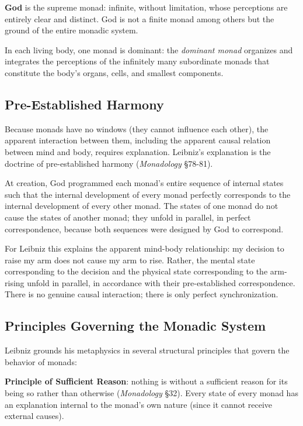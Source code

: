\documentclass[12pt]{article}
\begin{document}
\textbf{God} is the supreme monad: infinite, without limitation, whose
perceptions are entirely clear and distinct. God is not a finite monad
among others but the ground of the entire monadic system.

In each living body, one monad is dominant: the \emph{dominant monad}
organizes and integrates the perceptions of the infinitely many
subordinate monads that constitute the body's organs, cells, and
smallest components.

\subsection{Pre-Established Harmony}\label{pre-established-harmony}

Because monads have no windows (they cannot influence each other), the
apparent interaction between them, including the apparent causal
relation between mind and body, requires explanation. Leibniz's
explanation is the doctrine of pre-established harmony
(\emph{Monadology} §78-81).

At creation, God programmed each monad's entire sequence of internal
states such that the internal development of every monad perfectly
corresponds to the internal development of every other monad. The states
of one monad do not cause the states of another monad; they unfold in
parallel, in perfect correspondence, because both sequences were
designed by God to correspond.

For Leibniz this explains the apparent mind-body relationship: my
decision to raise my arm does not cause my arm to rise. Rather, the
mental state corresponding to the decision and the physical state
corresponding to the arm-rising unfold in parallel, in accordance with
their pre-established correspondence. There is no genuine causal
interaction; there is only perfect synchronization.

\subsection{Principles Governing the Monadic System}\label{principles-governing-the-monadic-system}

Leibniz grounds his metaphysics in several structural principles that
govern the behavior of monads:

\textbf{Principle of Sufficient Reason}: nothing is without a sufficient
reason for its being so rather than otherwise (\emph{Monadology} §32).
Every state of every monad has an explanation internal to the monad's
own nature (since it cannot receive external causes).
\end{document}
